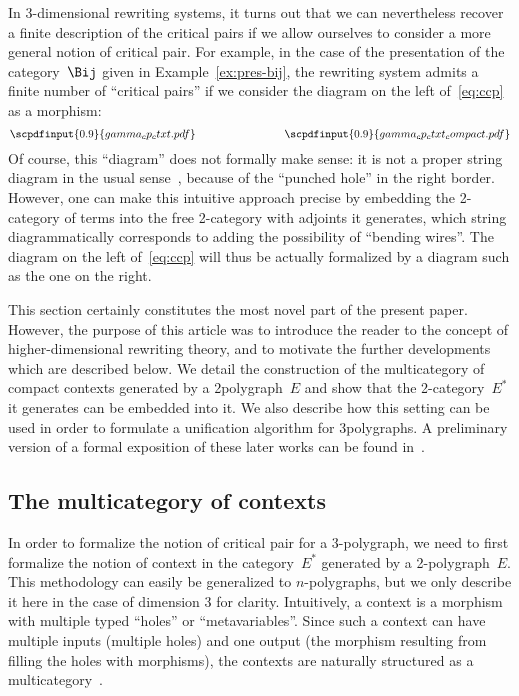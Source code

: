 \documentclass{LMCS}
\newcommand{\strid}[1]{\scpdfinput{0.9}{#1.pdf}}
\begin{document}
In 3-dimensional rewriting systems, it turns out that we can nevertheless
recover a finite description of the critical pairs if we allow ourselves to
consider a more general notion of critical pair. For example, in the case of the
presentation of the category~$\Bij$ given in Example~\ref{ex:pres-bij}, the
rewriting system admits a finite number of ``critical pairs'' if we consider the
diagram on the left of~\eqref{eq:ccp} as a morphism:
\begin{equation}
  \label{eq:ccp}
  \strid{gamma_cp_ctxt}
  \qquad\qquad\qquad\qquad
  \strid{gamma_cp_ctxt_compact}
\end{equation}
Of course, this ``diagram'' does not formally make sense: it is not a proper
string diagram in the usual sense~\cite{joyal-street:geometry-tensor-calculus},
because of the ``punched hole'' in the right border. However, one can make this
intuitive approach precise by embedding the 2-category of terms into the free
2-category with adjoints it generates, which string diagrammatically corresponds
to adding the possibility of ``bending wires''. The diagram on the left
of~\eqref{eq:ccp} will thus be actually formalized by a diagram such as the one
on the right.

This section certainly constitutes the most novel part of the present
paper. However, the purpose of this article was to introduce the reader to the
concept of higher-dimensional rewriting theory, and to motivate the further
developments which are described below. We detail the construction of the
multicategory of compact contexts generated by a 2\nbd{}polygraph~$E$ and show
that the 2-category~$E^*$ it generates can be embedded into it. We also describe
how this setting can be used in order to formulate a unification algorithm for
3\nbd{}polygraphs. A preliminary version of a formal exposition of these later
works can be found in~\cite{mimram:2-cp}.


\subsection{The multicategory of contexts}
\label{sec:contexts}
In order to formalize the notion of critical pair for a 3-polygraph, we need to
first formalize the notion of context in the category~$E^*$ generated by a
2-polygraph~$E$. This methodology can easily be generalized to $n$-polygraphs,
but we only describe it here in the case of dimension 3 for
clarity. Intuitively, a context is a morphism with multiple typed ``holes'' or
``metavariables''. Since such a context can have multiple inputs (\ie multiple
holes) and one output (the morphism resulting from filling the holes with
morphisms), the contexts are naturally structured as a
multicategory~\cite{leinster:higher-operads}.
\end{document}
